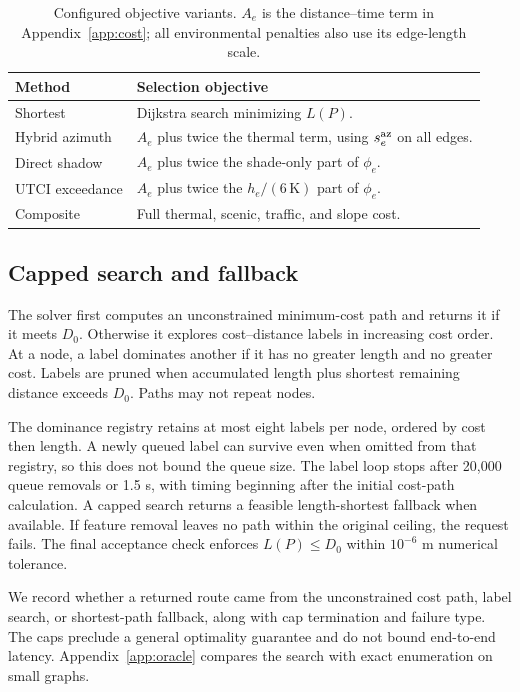 \documentclass[sigconf,nonacm]{acmart}
\begin{document}
\begin{table}[t]
\caption{Configured objective variants. $A_e$ is the distance--time term in Appendix~\ref{app:cost}; all environmental penalties also use its edge-length scale.}
\label{tab:methods}
\small
\begin{tabularx}{\columnwidth}{@{}lY@{}}\toprule
Method & Selection objective \\\midrule
Shortest & Dijkstra search minimizing $L(P)$.\\
Hybrid azimuth & $A_e$ plus twice the thermal term, using $s_e^{\rm az}$ on all edges.\\
Direct shadow & $A_e$ plus twice the shade-only part of $\phi_e$.\\
UTCI exceedance & $A_e$ plus twice the $h_e/(6\,\mathrm K)$ part of $\phi_e$.\\
Composite & Full thermal, scenic, traffic, and slope cost.\\\bottomrule
\end{tabularx}
\end{table}

\subsection{Capped search and fallback}\label{sec:search}
The solver first computes an unconstrained minimum-cost path and returns it if it meets $D_0$. Otherwise it explores cost--distance labels in increasing cost order. At a node, a label dominates another if it has no greater length and no greater cost. Labels are pruned when accumulated length plus shortest remaining distance exceeds $D_0$. Paths may not repeat nodes.

The dominance registry retains at most eight labels per node, ordered by cost then length. A newly queued label can survive even when omitted from that registry, so this does not bound the queue size. The label loop stops after 20,000 queue removals or 1.5 s, with timing beginning after the initial cost-path calculation. A capped search returns a feasible length-shortest fallback when available. If feature removal leaves no path within the original ceiling, the request fails. The final acceptance check enforces $L(P)\leq D_0$ within $10^{-6}$ m numerical tolerance.

We record whether a returned route came from the unconstrained cost path, label search, or shortest-path fallback, along with cap termination and failure type. The caps preclude a general optimality guarantee and do not bound end-to-end latency. Appendix~\ref{app:oracle} compares the search with exact enumeration on small graphs.
\end{document}
